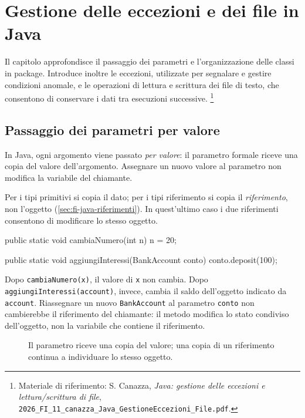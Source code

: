 \chapter{Gestione delle eccezioni e dei file in Java}
\label{chap:eccezioni-file-java}

Il capitolo approfondisce il passaggio dei parametri e
l'organizzazione delle classi in package. Introduce inoltre le
eccezioni, utilizzate per segnalare e gestire condizioni anomale,
e le operazioni di lettura e scrittura dei file di testo, che
consentono di conservare i dati tra esecuzioni successive.%
\footnote{Materiale di riferimento:
S. Canazza, \emph{Java: gestione delle eccezioni e lettura/scrittura
di file}, \nolinkurl{2026_FI_11_canazza_Java_GestioneEccezioni_File.pdf}.}

\section{Passaggio dei parametri per valore}
\label{sec:fi-java-file-parametri}

\begin{definition}
\label{def:fi-java-file-passaggio-valore}
In Java, ogni argomento viene passato \emph{per valore}: il parametro
formale riceve una copia del valore dell'argomento. Assegnare un nuovo
valore al parametro non modifica la variabile del chiamante.
\end{definition}

Per i tipi primitivi si copia il dato; per i tipi riferimento si copia
il \emph{riferimento}, non l'oggetto
(\cref{sec:fi-java-riferimenti}). In quest'ultimo caso i due
riferimenti consentono di modificare lo stesso oggetto.

\begin{unipdcode}[language=Java]
public static void cambiaNumero(int n) {
    n = 20;
}

public static void aggiungiInteressi(BankAccount conto) {
    conto.deposit(100);
}
\end{unipdcode}

Dopo \texttt{cambiaNumero(x)}, il valore di \texttt{x} non cambia.
Dopo \texttt{aggiungiInteressi(account)}, invece, cambia il saldo
dell'oggetto indicato da \texttt{account}. Riassegnare un nuovo
\texttt{BankAccount} al parametro \texttt{conto} non cambierebbe
il riferimento del chiamante: il metodo modifica lo stato
condiviso dell'oggetto, non la variabile che contiene il riferimento.

\begin{figure}[htbp]
  \centering
  
  \caption{Il parametro riceve una copia del valore; una copia di un
  riferimento continua a individuare lo stesso oggetto.}
  \label{fig:fi-java-file-passaggio-valore}
\end{figure}

